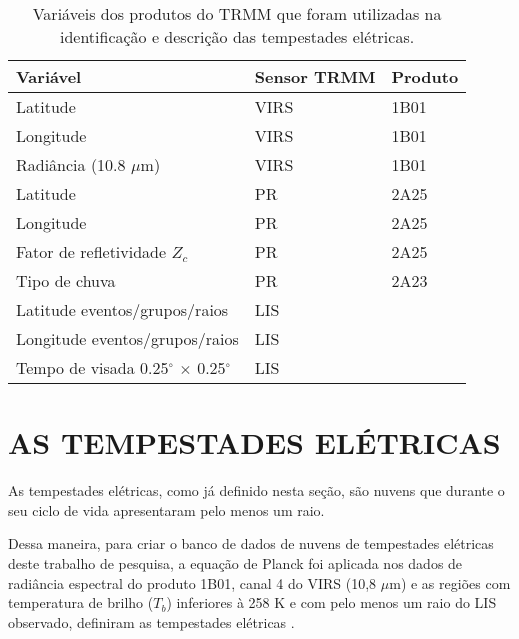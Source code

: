 \begin{table}[!h]
\centering
\small
\caption{Variáveis dos produtos do TRMM que foram utilizadas na identificação e descrição das tempestades elétricas.}
\label{varsTRMM}
\renewcommand {\tabularxcolumn }[1]{ >{\arraybackslash }m{#1}}
\begin{tabularx}{\textwidth}{ p{7cm} W W }
\hline
\hline
\textbf{Variável} & \textbf{Sensor TRMM} & \textbf{Produto} \\[1.5pt]
\hline
 Latitude & VIRS & 1B01 \\[1.5pt]
Longitude & VIRS & 1B01 \\[1.5pt]
 Radiância (10.8 $\mu$m) & VIRS & 1B01 \\[1.5pt]
Latitude & PR & 2A25 \\[1.5pt]
 Longitude & PR & 2A25 \\[1.5pt]
Fator de refletividade $Z_c$ & PR & 2A25 \\[1.5pt]
 Tipo de chuva  &  PR  & 2A23 \\[1.5pt]
Latitude eventos/grupos/raios & LIS &  \cite{rachel} \\[1.5pt]
 Longitude eventos/grupos/raios&LIS& \cite{rachel} \\[1.5pt]
Tempo de visada 0.25$^{\circ}$ $\times$ 0.25$^{\circ}$ & LIS &  \cite{rachel} \\

\hline
\end{tabularx} 
\end{table} 
 

\section{AS TEMPESTADES ELÉTRICAS}
\label{identificaTempestades}



As tempestades elétricas, como já definido nesta seção, são nuvens que durante o seu ciclo de vida apresentaram pelo menos um raio.

Dessa maneira, para criar o banco de dados de nuvens de tempestades elétricas deste trabalho de pesquisa, a equação de Planck foi aplicada nos dados de radiância espectral do produto 1B01, canal 4 do VIRS (10,8 $\mu$m) e as regiões com temperatura de brilho ($T_b$) inferiores à 258 K e com pelo menos um raio do LIS observado, definiram as tempestades elétricas \cite{morales2003}.

